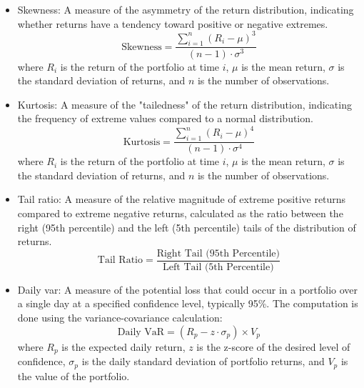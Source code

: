 \begin{itemize}
    \item Skewness: A measure of the asymmetry of the return distribution, indicating whether returns have a tendency toward positive or negative extremes.
    \begin{equation}
        \text{Skewness} = \frac{\sum_{i=1}^{n} (R_i - \mu)^3}{(n-1) \cdot \sigma^3}
    \end{equation}
    where $R_i$ is the return of the portfolio at time $i$, $\mu$ is the mean return, $\sigma$ is the standard deviation of returns, and $n$ is the number of observations.
    \item Kurtosis: A measure of the "tailedness" of the return distribution, indicating the frequency of extreme values compared to a normal distribution. 
    \begin{equation}
        \text{Kurtosis} = \frac{\sum_{i=1}^{n} (R_i - \mu)^4}{(n-1) \cdot \sigma^4}
    \end{equation}
    where $R_i$ is the return of the portfolio at time $i$, $\mu$ is the mean return, $\sigma$ is the standard deviation of returns, and $n$ is the number of observations.
    \item Tail ratio: A measure of the relative magnitude of extreme positive returns compared to extreme negative returns, calculated as the ratio between the right (95th percentile) and the left (5th percentile) tails of the distribution of returns. 
    \begin{equation}
        \text{Tail Ratio} = \frac{\text{Right Tail (95th Percentile)}}{\text{Left Tail (5th Percentile)}}
    \end{equation}
    \item Daily \acrfull{var}: A measure of the potential loss that could occur in a portfolio over a single day at a specified confidence level, typically 95\%. The computation is done using the variance-covariance calculation:
    \begin{equation}
        \text{Daily VaR} = \left(R_p - z \cdot \sigma_p \right) \times V_p
    \end{equation}
    where $R_p$ is the expected daily return, $z$ is the z-score of the desired level of confidence, $\sigma_p$ is the daily standard deviation of portfolio returns, and $V_p$ is the value of the portfolio.
\end{itemize}